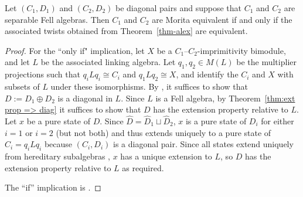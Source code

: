 \documentclass[12pt,a4paper]{amsart}
\newcommand{\red}{\operatorname{r}}
\newcommand{\tgcsa}[2]{\ensuremath{C^*_{\red}(#1 ; #2)}}
\begin{document}
\begin{lemma}\label{lem-twists}
Let $(C_1, D_1)$ and $(C_2, D_2)$ be diagonal pairs and suppose
that $C_1$ and $C_2$ are separable Fell algebras. Then $C_1$
and $C_2$ are Morita equivalent if and only if the associated
twists obtained from Theorem~\ref{thm-alex} are equivalent.
\end{lemma}
\begin{proof}
For the ``only if" implication, let $X$ be a
$C_1$--$C_2$-imprimitivity bimodule, and let $L$ be the
associated linking algebra. Let $q_1, q_2 \in M(L)$ be the
multiplier projections such that $q_i L q_i \cong C_i$ and $q_1
L q_2 \cong X$, and identify the $C_i$ and $X$ with subsets of
$L$ under these isomorphisms. By
\cite[Proposition~5.4]{Kumjian1986}, it suffices to show that $D
:= D_1 \oplus D_2$ is a diagonal in $L$.  Since $L$ is a Fell
algebra, by Theorem~\ref{thm:ext prop => diag} it suffices to
show that $D$ has the extension property relative to $L$. Let
$x$ be a pure state of $D$. Since $\widehat{D} = \widehat{D}_1
\sqcup \widehat{D}_2$, $x$ is a pure state of $D_i$ for either
$i=1$ or $i =2$ (but not both) and thus extends uniquely to a
pure state of $C_i = q_i L q_i$ because $(C_i, D_i)$ is a
diagonal pair. Since all states extend uniquely from hereditary
subalgebras \cite[Proposition 3.1.6]{Ped}, $x$ has a unique
extension to $L$, so $D$ has the extension property relative to
$L$ as required.

The ``if'' implication is \cite[Proposition~5.4]{Kumjian1986}.
\end{proof}

\end{document}
